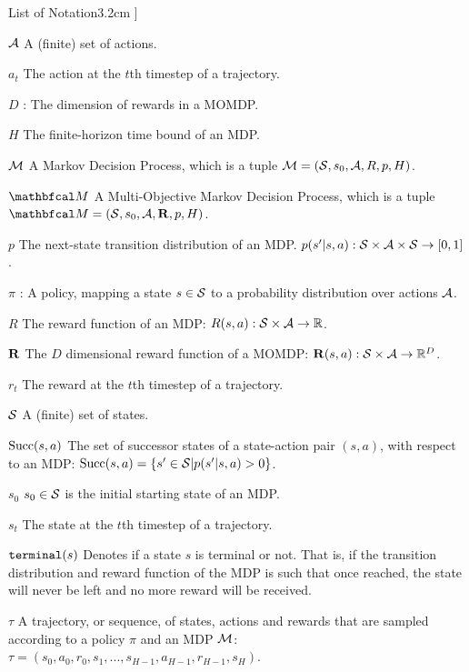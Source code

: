 \begin{mclistof}{List of Notation}{3.2cm}
{{          }}]
    \item[$\mathcal{A}$]
        A (finite) set of actions.
    \item[$a_t$]
        The action at the $t$th timestep of a trajectory.
    \item[$D$]:
        The dimension of rewards in a MOMDP.
    \item[$H$]
        The finite-horizon time bound of an MDP.
    \item[$\mathcal{M}$]
        A Markov Decision Process, which is a tuple $\mathcal{M}=(\mathcal{S},s_0,\mathcal{A},R,p,H)$.
    \item[$\bfcl{M}$] 
        A Multi-Objective Markov Decision Process, which is a tuple $\bfcl{M}=(\cl{S},s_0,\cl{A},\bff{R},p,H)$.
    \item[$p$] 
        The next-state transition distribution of an MDP.  $p(s' | s,a) : \mathcal{S} \times \mathcal{A} \times \mathcal{S} \rightarrow [0,1]$.
    \item[$\pi$]:
        A policy, mapping a state $s\in\mathcal{S}$ to a probability distribution over actions $\mathcal{A}$.
    \item[$R$] 
        The reward function of an MDP: $R(s,a) : \mathcal{S}\times \mathcal{A}\rightarrow \mathbb{R}$.
    \item[$\mathbf{R}$] 
        The $D$ dimensional reward function of a MOMDP: $\mathbf{R}(s,a) : \mathcal{S}\times \mathcal{A}\rightarrow \mathbb{R}^D$.
    \item[$r_t$]
        The reward at the $t$th timestep of a trajectory.
    \item[$\mathcal{S}$]
        A (finite) set of states.
    \item[${\textnormal{Succ}(s,a)}$]
        The set of successor states of a state-action pair $(s,a)$, with respect to an MDP: ${\textnormal{Succ}(s,a)}=\{s'\in\mathcal{S}|p(s'|s,a)>0\}$.
    \item[$s_0$]
        $s_0\in\mathcal{S}$ is the initial starting state of an MDP.
    \item[$s_t$]
        The state at the $t$th timestep of a trajectory.
    \item[${\textnormal{\texttt{terminal}}}(s)$]
        Denotes if a state $s$ is terminal or not. That is, if the transition distribution and reward function of the MDP is such that once reached, the state will never be left and no more reward will be received.
    \item[$\tau$]
        A trajectory, or sequence, of states, actions and rewards that are sampled according to a policy $\pi$ and an MDP $\mathcal{M}$: $\tau = (s_0, a_0, r_0, s_1, ..., s_{H-1}, a_{H-1}, r_{H-1}, s_H)$.

\end{mclistof}
